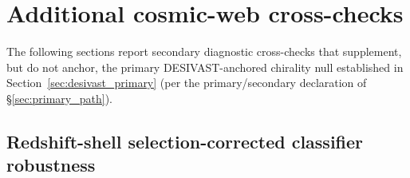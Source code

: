 \documentclass[aps,prd,twocolumn,superscriptaddress,showpacs,preprintnumbers,nofootinbib,longbibliography,floatfix]{revtex4-2}
\begin{document}
\section{Additional cosmic-web cross-checks}\label{sec:additional_cw}

The following sections report secondary diagnostic cross-checks
that supplement, but do not anchor, the primary DESIVAST-anchored
chirality null established in
Section~\ref{sec:desivast_primary} (per the primary/secondary
declaration of \S\ref{sec:primary_path}).

\subsection{Redshift-shell selection-corrected classifier
robustness}\label{sec:zshell_robustness}
\end{document}
